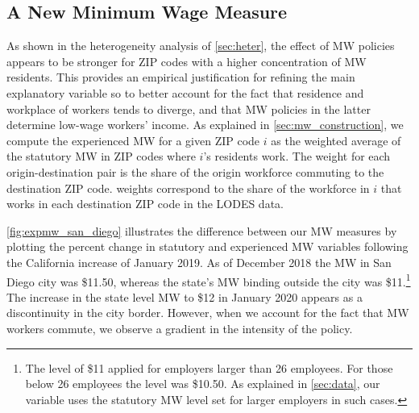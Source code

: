 \subsection{A New Minimum Wage Measure}

As shown in the heterogeneity analysis of \autoref{sec:heter}, the effect of MW policies 
appears to be stronger for ZIP codes with a higher concentration of MW residents. This 
provides an empirical justification for refining the main explanatory variable so to 
better account for the fact that residence and workplace of workers tends to diverge, 
and that MW policies in the latter determine low-wage workers' income. As explained in 
\autoref{sec:mw_construction}, we compute the experienced MW for a given ZIP code $i$ as 
the weighted average of the statutory MW in ZIP codes where $i$'s residents  work.
The weight for each origin-destination pair is the share of the origin workforce commuting to
the destination ZIP code. weights correspond to the share of the workforce in $i$ that works in 
each destination ZIP code in the LODES data.

\autoref{fig:expmw_san_diego} illustrates the difference between our MW measures by plotting 
the percent change in statutory and experienced MW variables following the California 
increase of January 2019. As of December 2018 the MW in San Diego city was \$11.50, whereas 
the state's MW binding outside the city was \$11.\footnote{The level of \$11 applied for 
	employers larger than 26 employees. For those below 26 employees the level was \$10.50. 
	As explained in 	\autoref{sec:data}, our variable uses the statutory MW level set for 
	larger employers in such cases.}
The increase in the state level MW to \$12 in January 2020 appears as a discontinuity in the 
city border. However, when we account for the fact that MW workers commute, we observe a 
gradient in the intensity of the policy.

